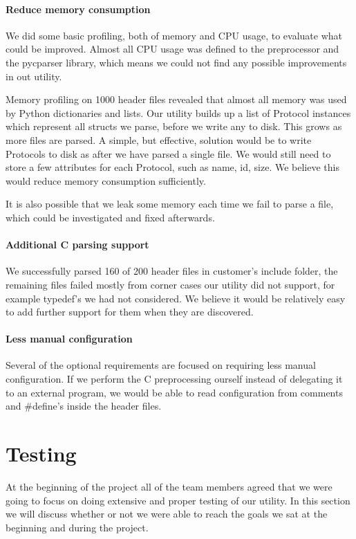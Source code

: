 \paragraph{Reduce memory consumption}
We did some basic profiling, both of memory and CPU usage, to evaluate what
could be improved. Almost all CPU usage was defined to the preprocessor and
the pycparser library, which means we could not find any possible improvements
in out utility.

Memory profiling on 1000 header files revealed that almost all memory was used
by Python dictionaries and lists. Our utility builds up a list of Protocol
instances which represent all structs we parse, before we write any to disk.
This grows as more files are parsed. A simple, but effective, solution would
be to write Protocols to disk as after we have parsed a single file. We would
still need to store a few attributes for each Protocol, such as name, id,
size. We believe this would reduce memory consumption sufficiently.

It is also possible that we leak some memory each time we fail to parse a
file, which could be investigated and fixed afterwards.

\paragraph{Additional C parsing support}
We successfully parsed 160 of 200 header files in customer's include folder,
the remaining files failed mostly from corner cases our utility did not
support, for example typedef's we had not considered. We believe it would be
relatively easy to add further support for them when they are discovered.

\paragraph{Less manual configuration}
Several of the optional requirements are focused on requiring less manual
configuration. If we perform the C preprocessing ourself instead of delegating
it to an external program, we would be able to read configuration from
comments and \#define's inside the header files.

\section{Testing}
At the beginning of the project all of the team members agreed that we were going to focus on doing extensive and proper testing of our utility. In this section we will discuss whether or not we were able to reach the goals we sat at the beginning and during the project.

